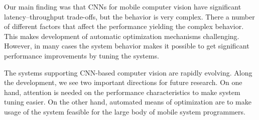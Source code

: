 \documentclass[sigconf]{acmart}
\begin{document}
Our main finding was that CNNs for mobile computer vision have significant latency--throughput trade-offs, but the behavior is very complex. There a number of different factors that affect the performance yielding the complex behavior. This makes development of automatic optimization mechanisms challenging. However, in many cases the system behavior makes it possible to get significant performance improvements by tuning the systems.

The systems supporting CNN-based computer vision are rapidly evolving. Along the development, we see two important directions for future research. On one hand, attention is needed on the performance characteristics to make system tuning easier. On the other hand, automated means of optimization are to make usage of the system feasible for the large body of mobile system programmers.





 


%

%

%

\end{document}
